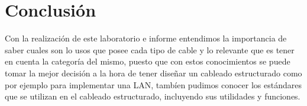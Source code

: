 \documentclass{udpreport}
\begin{document}
\chapter{Conclusión}
    Con la realización de este laboratorio e informe entendimos la importancia de saber cuales son lo usos que posee cada tipo de cable y lo relevante que es tener en cuenta la categoría del mismo, puesto que con estos conocimientos se puede tomar la mejor decisión a la hora de tener diseñar un cableado estructurado como por ejemplo para implementar una LAN, tambíen pudimos conocer los estándares que se utilizan en el cableado estructurado, incluyendo sus utilidades y funciones.
\begin{thebibliography}{x}
\end{thebibliography}
\end{document}
